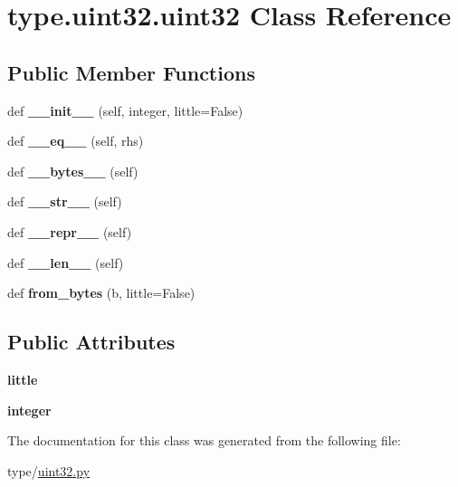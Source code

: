 \hypertarget{classtype_1_1uint32_1_1uint32}{}\section{type.\+uint32.\+uint32 Class Reference}
\label{classtype_1_1uint32_1_1uint32}
\subsection*{Public Member Functions}
\begin{DoxyCompactItemize}
\item 
\mbox{\label{classtype_1_1uint32_1_1uint32_a4dca3ecd6b49b2d623d52a69d1390d02}} 
def {\bfseries \+\_\+\+\_\+init\+\_\+\+\_\+} (self, integer, little=False)
\item 
\mbox{\label{classtype_1_1uint32_1_1uint32_a4d44a1518bf550603ab2c4283d92386a}} 
def {\bfseries \+\_\+\+\_\+eq\+\_\+\+\_\+} (self, rhs)
\item 
\mbox{\label{classtype_1_1uint32_1_1uint32_a4349f7df30bbf97a1390acd1ab06cc9c}} 
def {\bfseries \+\_\+\+\_\+bytes\+\_\+\+\_\+} (self)
\item 
\mbox{\label{classtype_1_1uint32_1_1uint32_a78e84b71bd5e76882198812d4496230d}} 
def {\bfseries \+\_\+\+\_\+str\+\_\+\+\_\+} (self)
\item 
\mbox{\label{classtype_1_1uint32_1_1uint32_a025f30339ed4fd8dd8e0ddb2c696efa1}} 
def {\bfseries \+\_\+\+\_\+repr\+\_\+\+\_\+} (self)
\item 
\mbox{\label{classtype_1_1uint32_1_1uint32_acc21bc2baa9131dfcc28590710b6eb70}} 
def {\bfseries \+\_\+\+\_\+len\+\_\+\+\_\+} (self)
\item 
\mbox{\label{classtype_1_1uint32_1_1uint32_a79d89118f0cc2f4aa35f1aa93c7bd1b7}} 
def {\bfseries from\+\_\+bytes} (b, little=False)
\end{DoxyCompactItemize}
\subsection*{Public Attributes}
\begin{DoxyCompactItemize}
\item 
\mbox{\label{classtype_1_1uint32_1_1uint32_aa8b2d75a941d9d3e90a81c6b166c9b5d}} 
{\bfseries little}
\item 
\mbox{\label{classtype_1_1uint32_1_1uint32_a8e49aa39141ef9f6b7a5e873ee47c159}} 
{\bfseries integer}
\end{DoxyCompactItemize}


The documentation for this class was generated from the following file\+:\begin{DoxyCompactItemize}
\item 
type/\mbox{\hyperlink{uint32_8py}{uint32.\+py}}\end{DoxyCompactItemize}

